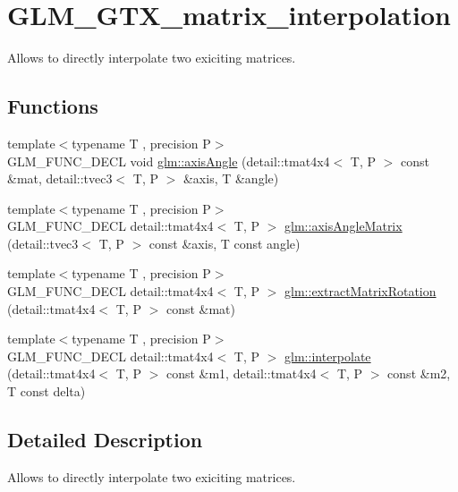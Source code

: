 \hypertarget{group__gtx__matrix__interpolation}{}\section{G\+L\+M\+\_\+\+G\+T\+X\+\_\+matrix\+\_\+interpolation}
\label{group__gtx__matrix__interpolation}


Allows to directly interpolate two exiciting matrices.  


\subsection*{Functions}
\begin{DoxyCompactItemize}
\item 
{\footnotesize template$<$typename T , precision P$>$ }\\G\+L\+M\+\_\+\+F\+U\+N\+C\+\_\+\+D\+E\+CL void \hyperlink{group__gtx__matrix__interpolation_gadf049332345bf754b63fe24a914f8fac}{glm\+::axis\+Angle} (detail\+::tmat4x4$<$ T, P $>$ const \&mat, detail\+::tvec3$<$ T, P $>$ \&axis, T \&angle)
\item 
{\footnotesize template$<$typename T , precision P$>$ }\\G\+L\+M\+\_\+\+F\+U\+N\+C\+\_\+\+D\+E\+CL detail\+::tmat4x4$<$ T, P $>$ \hyperlink{group__gtx__matrix__interpolation_gafc6982aa7c8e8198b21f038f51fc4b90}{glm\+::axis\+Angle\+Matrix} (detail\+::tvec3$<$ T, P $>$ const \&axis, T const angle)
\item 
{\footnotesize template$<$typename T , precision P$>$ }\\G\+L\+M\+\_\+\+F\+U\+N\+C\+\_\+\+D\+E\+CL detail\+::tmat4x4$<$ T, P $>$ \hyperlink{group__gtx__matrix__interpolation_gacb1e3e76c1710d89a1852d87d58c021e}{glm\+::extract\+Matrix\+Rotation} (detail\+::tmat4x4$<$ T, P $>$ const \&mat)
\item 
{\footnotesize template$<$typename T , precision P$>$ }\\G\+L\+M\+\_\+\+F\+U\+N\+C\+\_\+\+D\+E\+CL detail\+::tmat4x4$<$ T, P $>$ \hyperlink{group__gtx__matrix__interpolation_gad7dbb702234767be1b4d3c191a2327ac}{glm\+::interpolate} (detail\+::tmat4x4$<$ T, P $>$ const \&m1, detail\+::tmat4x4$<$ T, P $>$ const \&m2, T const delta)
\end{DoxyCompactItemize}


\subsection{Detailed Description}
Allows to directly interpolate two exiciting matrices. 

